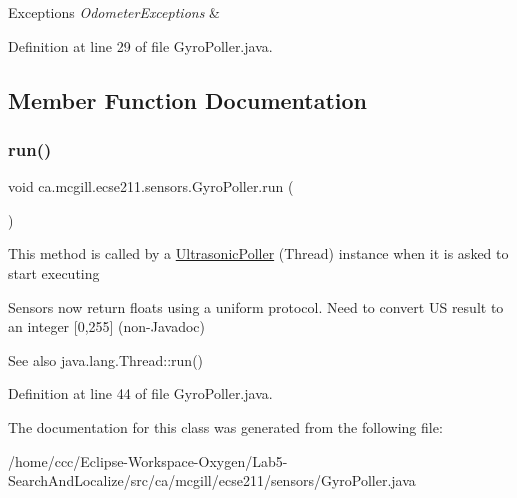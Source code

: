 \begin{DoxyExceptions}{Exceptions}
{\em Odometer\+Exceptions} & \\
\hline
\end{DoxyExceptions}


Definition at line 29 of file Gyro\+Poller.\+java.



\subsection{Member Function Documentation}
\mbox{\label{classca_1_1mcgill_1_1ecse211_1_1sensors_1_1_gyro_poller_a2a52059192555ece72190fa44a761d28}} 
\subsubsection{\texorpdfstring{run()}{run()}}
{\footnotesize\ttfamily void ca.\+mcgill.\+ecse211.\+sensors.\+Gyro\+Poller.\+run (\begin{DoxyParamCaption}{ }\end{DoxyParamCaption})}

This method is called by a \hyperlink{classca_1_1mcgill_1_1ecse211_1_1sensors_1_1_ultrasonic_poller}{Ultrasonic\+Poller} (Thread) instance when it is asked to start executing

Sensors now return floats using a uniform protocol. Need to convert US result to an integer \mbox{[}0,255\mbox{]} (non-\/\+Javadoc)

\begin{DoxySeeAlso}{See also}
java.\+lang.\+Thread\+::run() 
\end{DoxySeeAlso}


Definition at line 44 of file Gyro\+Poller.\+java.



The documentation for this class was generated from the following file\+:\begin{DoxyCompactItemize}
\item 
/home/ccc/\+Eclipse-\/\+Workspace-\/\+Oxygen/\+Lab5-\/\+Search\+And\+Localize/src/ca/mcgill/ecse211/sensors/Gyro\+Poller.\+java\end{DoxyCompactItemize}
